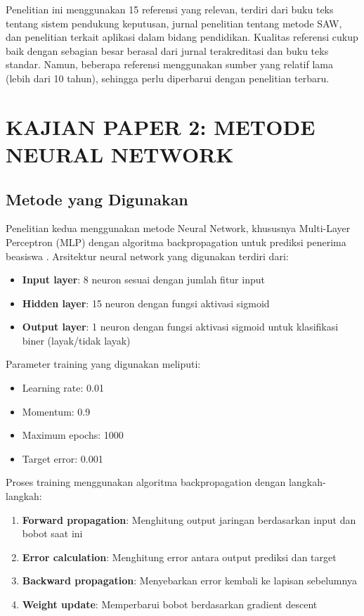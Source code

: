 \documentclass[10pt,a4paper]{article}
\begin{document}
Penelitian ini menggunakan 15 referensi yang relevan, terdiri dari buku teks tentang sistem pendukung keputusan, jurnal penelitian tentang metode SAW, dan penelitian terkait aplikasi dalam bidang pendidikan. Kualitas referensi cukup baik dengan sebagian besar berasal dari jurnal terakreditasi dan buku teks standar. Namun, beberapa referensi menggunakan sumber yang relatif lama (lebih dari 10 tahun), sehingga perlu diperbarui dengan penelitian terbaru.

\section{KAJIAN PAPER 2: METODE NEURAL NETWORK}

\subsection{Metode yang Digunakan}

Penelitian kedua menggunakan metode Neural Network, khususnya Multi-Layer Perceptron (MLP) dengan algoritma backpropagation untuk prediksi penerima beasiswa \cite{haykin2009neural}. Arsitektur neural network yang digunakan terdiri dari:

\begin{itemize}
    \item \textbf{Input layer}: 8 neuron sesuai dengan jumlah fitur input
    \item \textbf{Hidden layer}: 15 neuron dengan fungsi aktivasi sigmoid
    \item \textbf{Output layer}: 1 neuron dengan fungsi aktivasi sigmoid untuk klasifikasi biner (layak/tidak layak)
\end{itemize}

Parameter training yang digunakan meliputi:
\begin{itemize}
    \item Learning rate: 0.01
    \item Momentum: 0.9
    \item Maximum epochs: 1000
    \item Target error: 0.001
\end{itemize}

Proses training menggunakan algoritma backpropagation dengan langkah-langkah:
\begin{enumerate}
    \item \textbf{Forward propagation}: Menghitung output jaringan berdasarkan input dan bobot saat ini
    \item \textbf{Error calculation}: Menghitung error antara output prediksi dan target
    \item \textbf{Backward propagation}: Menyebarkan error kembali ke lapisan sebelumnya
    \item \textbf{Weight update}: Memperbarui bobot berdasarkan gradient descent
\end{enumerate}
\end{document}
